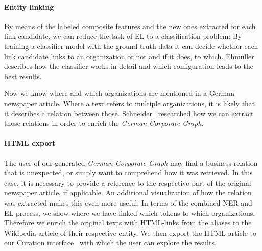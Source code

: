 \paragraph{Entity linking}
By means of the labeled composite features and the new ones extracted for each link candidate, we can reduce the task of EL to a classification problem: By training a classifier model with the ground truth data it can decide whether each link candidate links to an organization or not and if it does, to which. Ehmüller~\cite{ehmueller} describes how the classifier works in detail and which configuration leads to the best results.

Now we know where and which organizations are mentioned in a German newspaper article. Where a text refers to multiple organizations, it is likely that it describes a relation between those. Schneider~\cite{schneider} researched how we can extract those relations in order to enrich the \textit{German Corporate Graph}.


\paragraph{HTML export}
The user of our generated \textit{German Corporate Graph} may find a business relation that is unexpected, or simply want to comprehend how it was retrieved. In this case, it is necessary to provide a reference to the respective part of the original newspaper article, if applicable. An additional visualization of how the relation was extracted makes this even more useful. In terms of the combined NER and EL process, we show where we have linked which tokens to which organizations. Therefore we enrich the original texts with HTML-links from the aliases to the Wikipedia article of their respective entity. We then export the HTML article to our Curation interface~\cite{gruner} with which the user can explore the results.
